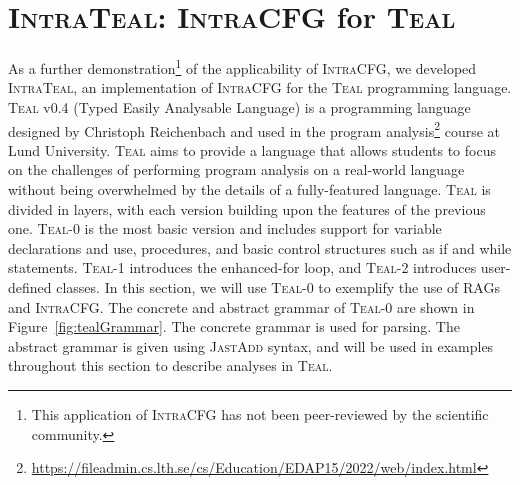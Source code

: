 \section{\textsc{IntraTeal}: \textsc{IntraCFG} for \textsc{Teal}}
\label{sec:intraTeal}
As a further demonstration\footnote{This application of \textsc{IntraCFG} has not been
peer-reviewed by the scientific community.} of the applicability of \textsc{IntraCFG},
we developed \textsc{IntraTeal}, an implementation of \textsc{IntraCFG} for the \textsc{Teal} programming language.
\textsc{Teal} v0.4 (Typed Easily Analysable Language) is a programming language designed by Christoph Reichenbach and used in the
program analysis\footnote{\url{https://fileadmin.cs.lth.se/cs/Education/EDAP15/2022/web/index.html}} course at Lund University.
\textsc{Teal} aims to provide a language that allows students to
focus on the challenges of performing program analysis on a real-world language
without being overwhelmed by the details of a fully-featured language.
\textsc{Teal} is divided in layers, with each version building
upon the features of the previous one. \textsc{Teal}-0 is the most basic version and includes
support for variable declarations and use, procedures, and basic control structures such as if
and while statements. \textsc{Teal}-1 introduces the enhanced-for loop, and \textsc{Teal}-2
introduces user-defined classes.
In this section,  we will use \textsc{Teal}-0 to exemplify the use of RAGs
and \textsc{IntraCFG}.
The concrete and abstract grammar of \textsc{Teal}-0 are shown in Figure~\ref{fig:tealGrammar}.
The concrete grammar is used for parsing. The abstract grammar is given using
\textsc{JastAdd} syntax, and will be used in examples throughout this section
to describe analyses in \textsc{Teal}.
\newsavebox{\mylistingbox}

